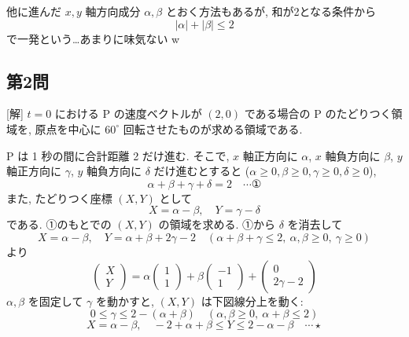 \documentclass[../main.tex]{subfiles}
\begin{document}
他に進んだ $x, y$ 軸方向成分 $\alpha, \beta$ とおく方法もあるが, 和が2となる条件から
\[
  |\alpha| + |\beta| \le 2
\]
で一発という\dots あまりに味気ない w

\vspace{1em}

\begin{center}

  \vspace{0.5em}

\end{center}

\newpage

\subsection*{第2問}

[解] $t=0$ における P の速度ベクトルが $(2, 0)$ である場合の P のたどりつく領域を, 原点を中心に $60^\circ$ 回転させたものが求める領域である.

P は 1 秒の間に合計距離 2 だけ進む. そこで, $x$ 軸正方向に $\alpha$, $x$ 軸負方向に $\beta$, $y$ 軸正方向に $\gamma$, $y$ 軸負方向に $\delta$ だけ進むとすると ($\alpha \ge 0, \beta \ge 0, \gamma \ge 0, \delta \ge 0$),
\[
  \alpha + \beta + \gamma + \delta = 2 \quad \cdots \text{①}
\]
また, たどりつく座標 $(X, Y)$ として
\[
  X = \alpha - \beta, \quad Y = \gamma - \delta
\]
である. ①のもとでの $(X, Y)$ の領域を求める. ①から $\delta$ を消去して
\[
  X = \alpha - \beta, \quad Y = \alpha + \beta + 2\gamma - 2 \quad (\alpha + \beta + \gamma \le 2, \ \alpha, \beta \ge 0, \ \gamma \ge 0)
\]
より
\[
  \begin{pmatrix} X \\ Y
  \end{pmatrix} = \alpha
  \begin{pmatrix} 1 \\ 1
  \end{pmatrix} + \beta
  \begin{pmatrix} -1 \\ 1
  \end{pmatrix} +
  \begin{pmatrix} 0 \\ 2\gamma - 2
  \end{pmatrix}
\]
$\alpha, \beta$ を固定して $\gamma$ を動かすと, $(X, Y)$ は下図線分上を動く:
\[
  0 \le \gamma \le 2 - (\alpha + \beta) \quad (\alpha, \beta \ge 0, \ \alpha + \beta \le 2)
\]
\[
  X = \alpha - \beta, \quad -2 + \alpha + \beta \le Y \le 2 - \alpha - \beta \quad \cdots \star
\]
\end{document}
